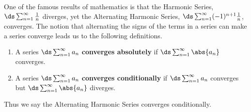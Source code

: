 One of the famous results of mathematics is that the Harmonic Series,\vspace{-.5\baselineskip} $\ds \sum_{n=1}^\infty \frac1n$ diverges, yet the Alternating Harmonic Series, $\ds \sum_{n=1}^\infty (-1)^{n+1}\frac1n$, converges. The notion that alternating the signs of the terms in a series can make a series converge leads us to the following definitions.

\begin{definition}\label{def:abs_converge}
%
\begin{enumerate}
	\item A series $\ds \sum_{n=1}^\infty a_n$ \textbf{converges absolutely} if $\ds \sum_{n=1}^\infty \abs{a_n}$ converges.
	\item A series $\ds \sum_{n=1}^\infty a_n$ \textbf{converges conditionally} if $\ds \sum_{n=1}^\infty a_n$ converges but $\ds \sum_{n=1}^\infty \abs{a_n}$ diverges.
\end{enumerate}
\end{definition}


Thus we say the Alternating Harmonic Series converges conditionally.

